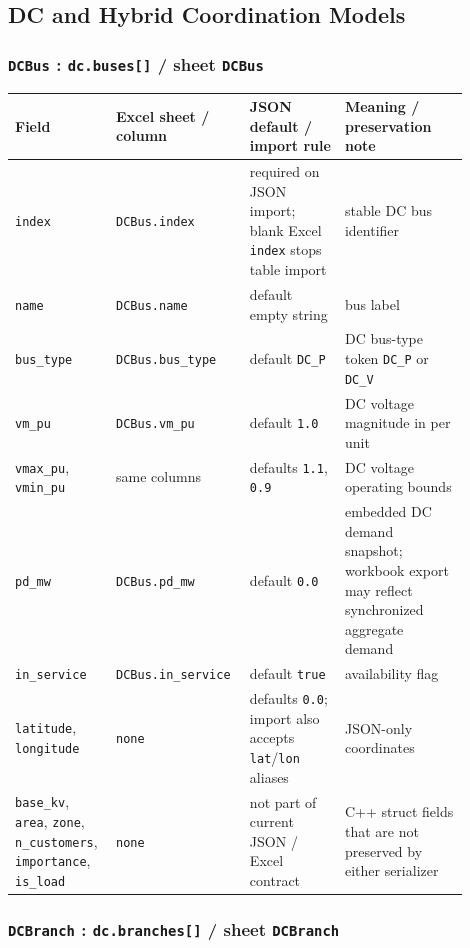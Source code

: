 \subsection{DC and Hybrid Coordination Models}

\subsubsection*{\texttt{DCBus} : \texttt{dc.buses[]} / sheet \texttt{DCBus}}

\begin{longtable}{L{0.20\linewidth}L{0.24\linewidth}L{0.20\linewidth}L{0.26\linewidth}}
\toprule
Field & Excel sheet / column & JSON default / import rule & Meaning / preservation note \\
\midrule
\endhead
\texttt{index} & \texttt{DCBus.index} & required on JSON import; blank Excel \texttt{index} stops table import & stable DC bus identifier \\
\texttt{name} & \texttt{DCBus.name} & default empty string & bus label \\
\texttt{bus\_type} & \texttt{DCBus.bus\_type} & default \texttt{DC\_P} & DC bus-type token \texttt{DC\_P} or \texttt{DC\_V} \\
\texttt{vm\_pu} & \texttt{DCBus.vm\_pu} & default \texttt{1.0} & DC voltage magnitude in per unit \\
\texttt{vmax\_pu}, \texttt{vmin\_pu} & same columns & defaults \texttt{1.1}, \texttt{0.9} & DC voltage operating bounds \\
\texttt{pd\_mw} & \texttt{DCBus.pd\_mw} & default \texttt{0.0} & embedded DC demand snapshot; workbook export may reflect synchronized aggregate demand \\
\texttt{in\_service} & \texttt{DCBus.in\_service} & default \texttt{true} & availability flag \\
\texttt{latitude}, \texttt{longitude} & \texttt{none} & defaults \texttt{0.0}; import also accepts \texttt{lat}/\texttt{lon} aliases & JSON-only coordinates \\
\texttt{base\_kv}, \texttt{area}, \texttt{zone}, \texttt{n\_customers}, \texttt{importance}, \texttt{is\_load} & \texttt{none} & not part of current JSON / Excel contract & C++ struct fields that are not preserved by either serializer \\
\bottomrule
\end{longtable}

\subsubsection*{\texttt{DCBranch} : \texttt{dc.branches[]} / sheet \texttt{DCBranch}}

